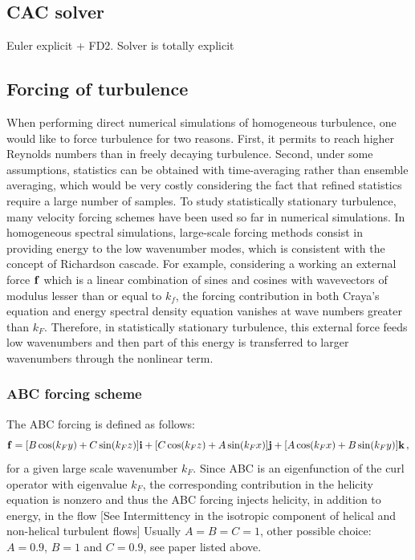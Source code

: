 \documentclass[11pt]{article}
\begin{document}
\subsection{CAC solver}

Euler explicit + FD2.
Solver is totally explicit 

\subsection{Forcing of turbulence}

When performing direct numerical simulations of homogeneous turbulence, one would like to force turbulence for two reasons. 
First, it permits to reach higher Reynolds numbers than in freely decaying turbulence. 
Second, under some assumptions, statistics can be obtained with time-averaging rather than ensemble averaging, which would be very costly considering the fact that refined statistics require a large number of samples. 
To study statistically stationary turbulence, many velocity forcing schemes have been used so far in numerical simulations. 
In homogeneous spectral simulations, large-scale forcing methods consist in providing energy to the low wavenumber modes, which is consistent with the concept of Richardson cascade. 
For example, considering a working an external force $\bf f$ which is a linear combination of sines and cosines with wavevectors of modulus lesser than or equal to $k_f$, the forcing contribution in both
Craya’s equation and energy spectral density equation vanishes at wave numbers greater than $k_F$.
Therefore, in statistically stationary turbulence, this external force feeds low wavenumbers and then part of this energy is transferred to larger wavenumbers through the nonlinear term.

\subsubsection{ABC forcing scheme}
The ABC forcing is defined as follows:
\begin{equation}
{\bf f} = [B \cos (k_F y) + C \sin (k_F z) ]{\bf i} \\ + [C \cos (k_F z)+ A \sin (k_F x) ]{\bf j} + [A \cos (k_F x) + B \sin (k_F y)] {\bf k}\, ,
\end{equation}
for a given large scale wavenumber $k_F$. 
Since ABC is an eigenfunction of the curl operator with eigenvalue $k_F$, the corresponding contribution in the helicity equation is nonzero and thus the ABC forcing injects helicity, in addition to energy, in the flow [See Intermittency in the isotropic component of helical and non-helical turbulent flows]
Usually $A=B=C=1$, other possible choice: $A=0.9$, $B=1$ and $C=0.9$, see paper listed above.
\end{document}
